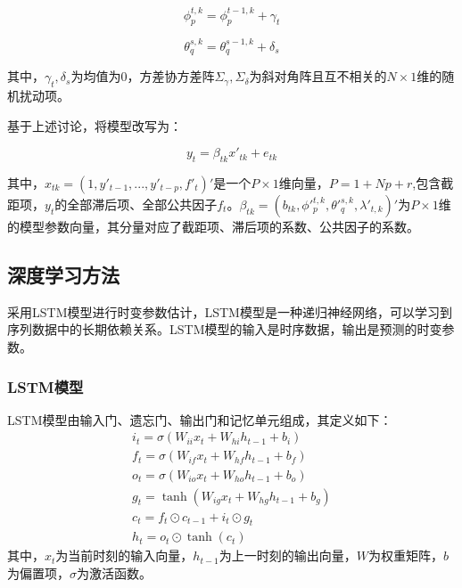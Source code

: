 \documentclass[12pt,a4paper]{article}
\begin{document}
\begin{equation}
    \phi_{p}^{t,k}=\phi_p^{t-1,k}+\gamma_t 
\end{equation}

\begin{equation}
    \theta_{q}^{s,k}=\theta_q^{s-1,k}+\delta_s
\end{equation}

其中，$\gamma_t,\delta_s$为均值为0，方差协方差阵$\Sigma_\gamma,\Sigma_\delta$为斜对角阵且互不相关的$N \times 1$维的随机扰动项。

基于上述讨论，将模型改写为：

\begin{equation}
y_t = \beta_{tk} x'_{tk}+e_{tk}
\end{equation}

其中，$x_{tk}=(1,y'_{t-1},...,y'_{t-p},f'_{t})'$是一个$P \times 1$维向量，$P=1+Np+r$,包含截距项，$y_t$的全部滞后项、全部公共因子$f_t$。$\beta_{tk}=(b_{tk},\phi'_{p}^{t,k},\theta'_{q}^{s,k},\lambda'_{t,k})'$为$P \times 1$维的模型参数向量，其分量对应了截距项、滞后项的系数、公共因子的系数。
\subsection{深度学习方法}
采用LSTM模型进行时变参数估计，LSTM模型是一种递归神经网络，可以学习到序列数据中的长期依赖关系。LSTM模型的输入是时序数据，输出是预测的时变参数。
\subsubsection{LSTM模型}
LSTM模型由输入门、遗忘门、输出门和记忆单元组成，其定义如下：
\begin{equation}
    \begin{array}{ll}
        i_t = \sigma(W_{ii} x_t + W_{hi} h_{t-1} + b_i) \\
        f_t = \sigma(W_{if} x_t + W_{hf} h_{t-1} + b_f) \\
        o_t = \sigma(W_{io} x_t + W_{ho} h_{t-1} + b_o) \\
        g_t = \tanh(W_{ig} x_t + W_{hg} h_{t-1} + b_g) \\
        c_t = f_t \odot c_{t-1} + i_t \odot g_t \\
        h_t = o_t \odot \tanh(c_t)
    \end{array}
\end{equation}
其中，$x_t$为当前时刻的输入向量，$h_{t-1}$为上一时刻的输出向量，$W$为权重矩阵，$b$为偏置项，$\sigma$为激活函数。




\newpage
\printbibliography
\end{document}
